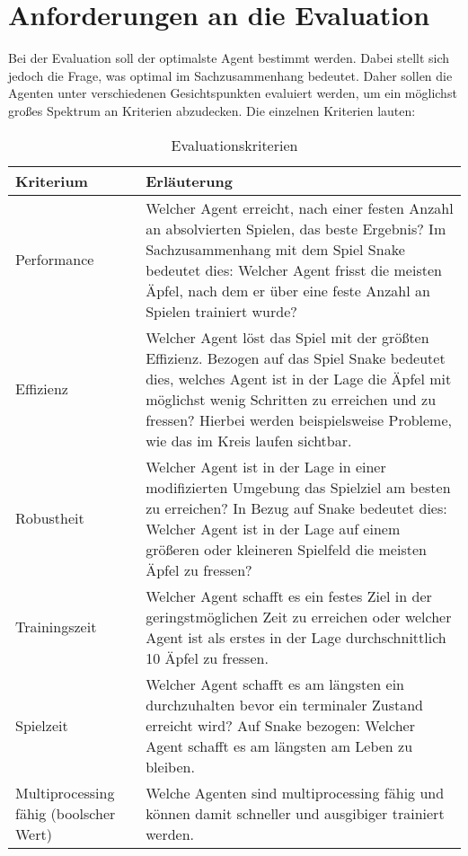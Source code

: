 \section{Anforderungen an die Evaluation}
Bei der Evaluation soll der optimalste Agent bestimmt werden. Dabei stellt sich jedoch die Frage, was optimal im Sachzusammenhang bedeutet. 
Daher sollen die Agenten unter verschiedenen Gesichtspunkten evaluiert werden, um ein möglichst großes Spektrum an Kriterien abzudecken.
Die einzelnen Kriterien lauten:
\begin{longtable}[h]{|p{4cm}|p{\linewidth - 5cm}|}
	\caption{Evaluationskriterien}
	\label{tab:Kriterien} 
	\endfirsthead
	\endhead
	\hline
	Kriterium & Erläuterung \\
	\hline
	Performance & Welcher Agent erreicht, nach einer festen Anzahl an absolvierten Spielen, das beste Ergebnis? Im Sachzusammenhang mit dem Spiel Snake bedeutet dies: Welcher Agent frisst die meisten Äpfel, nach dem er über eine feste Anzahl an Spielen trainiert wurde? \\
	\hline
	Effizienz & Welcher Agent löst das Spiel mit der größten Effizienz. Bezogen auf das Spiel Snake bedeutet dies, welches Agent ist in der Lage die Äpfel mit möglichst wenig Schritten zu erreichen und zu fressen? Hierbei werden beispielsweise Probleme, wie das im Kreis laufen sichtbar. \\
	\hline
	Robustheit & Welcher Agent ist in der Lage in einer modifizierten Umgebung das Spielziel am besten zu erreichen? In Bezug auf Snake bedeutet dies: Welcher Agent ist in der Lage auf einem größeren oder kleineren Spielfeld die meisten Äpfel zu fressen? \\
	\hline
	Trainingszeit & Welcher Agent schafft es ein festes Ziel in der geringstmöglichen Zeit zu erreichen oder welcher Agent ist als erstes in der Lage durchschnittlich 10 Äpfel zu fressen. \\
	\hline
	Spielzeit & Welcher Agent schafft es am längsten ein durchzuhalten bevor ein terminaler Zustand erreicht wird? Auf Snake bezogen: Welcher Agent schafft es am längsten am Leben zu bleiben. \\
	\hline
	Multiprocessing fähig (boolscher Wert) & Welche Agenten sind multiprocessing fähig und können damit schneller und ausgibiger trainiert werden. \\
	\hline
\end{longtable}